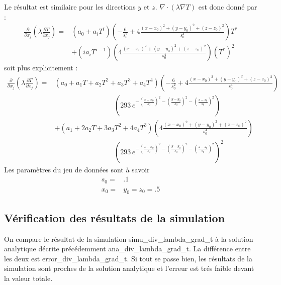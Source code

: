 Le r\'esultat est similaire pour les directions $y$ et $z$.
$\nabla\cdot\left(\lambda \nabla T\right)$ est donc donn\'e par :
\begin{equation}
\begin{aligned}
\frac{\partial}{\partial x_j} \left(\lambda \frac{\partial T}{\partial x_j}\right) ={}& \left(a_0 + a_i T^i\right) \left(-\frac{6}{s_0^2} + 4\frac{\left(x-x_0\right)^2+\left(y-y_0\right)^2+\left(z-z_0\right)^2}{s_0^4}\right) T^* \\
&+ \left(i a_i T^{i-1}\right) \left(4\frac{\left(x-x_0\right)^2+\left(y-y_0\right)^2+\left(z-z_0\right)^2}{s_0^4}\right) \left(T^*\right)^2
\end{aligned}
\end{equation}
soit plus explicitement :
\begin{equation}
\begin{aligned}
\frac{\partial}{\partial x_j} \left(\lambda \frac{\partial T}{\partial x_j}\right) ={}& \left(a_0+a_1 T +a_2 T^2 +a_3 T^3 + a_4 T^4\right) \left(-\frac{6}{s_0^2} + 4\frac{\left(x-x_0\right)^2+\left(y-y_0\right)^2+\left(z-z_0\right)^2}{s_0^4}\right) \\
&\phantom{aaaaaaaaaaaaaaaa}\left(293\, e^{-\left(\frac{x-x_0}{s_0}\right)^2-\left(\frac{y-y_0}{s_0}\right)^2-\left(\frac{z-z_0}{s_0}\right)^2}\right) \\
&+ \left(a_1 + 2 a_2 T + 3 a_3 T^2 + 4 a_4 T^3\right) \left(4\frac{\left(x-x_0\right)^2+\left(y-y_0\right)^2+\left(z-z_0\right)^2}{s_0^4}\right) \\
&\phantom{aaaaaaaaaaaaaaaa}\left(293\, e^{-\left(\frac{x-x_0}{s_0}\right)^2-\left(\frac{y-y_0}{s_0}\right)^2-\left(\frac{z-z_0}{s_0}\right)^2}\right)^2
\end{aligned}
\end{equation}
Les param\`etres du jeu de donn\'ees sont \`a savoir
\begin{align*}
s_0 ={}& .1 \\
x_0 ={}& y_0 = z_0 = .5
\end{align*}

\subsection{V\'erification des r\'esultats de la simulation}

On compare le r\'esultat de la simulation {\textsf simu\_div\_lambda\_grad\_t} \`a la solution analytique d\'ecrite pr\'ec\'edemment {\textsf ana\_div\_lambda\_grad\_t}. La diff\'erence entre les deux est \textsf{error\_div\_lambda\_grad\_t}. Si tout se passe bien, les r\'esultats de la simulation sont proches de la solution analytique et l'erreur est tr\'es faible devant la valeur totale.



